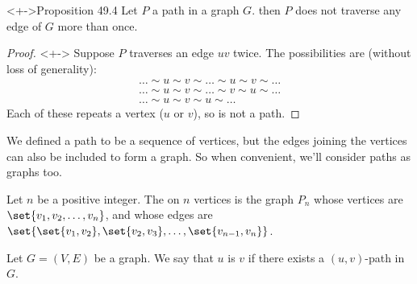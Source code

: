\documentclass
[ignorenonframetext,14pt,aspectratio=169]
{ngelessonslides}
\begin{document}
\begin{frame}[label=path-prop]
\begin{block}<+->{Proposition 49.4}
    Let $P$ a path in a graph $G$.  then $P$ does not traverse any edge of $G$ more than once.
\end{block}
\begin{proof}<+->
Suppose $P$ traverses an edge $uv$ twice.  The possibilities are (without loss of generality):
\begin{gather*}
 \dots \sim u \sim v \sim \dots \sim u \sim v \sim \dots \\
\dots \sim u \sim v \sim \dots \sim v \sim u \sim \dots \\
\dots \sim u \sim v \sim u \sim \dots
\end{gather*}
Each of these repeats a vertex ($u$ or $v$), so is not a path.
\end{proof}
\end{frame}

\begin{frame}[label=path-graph-def]
We defined a path to be a sequence of vertices, but the edges joining the vertices
can also be included to form a graph.  So when convenient, we'll consider paths as graphs too.
\begin{definition}
    Let $n$ be a positive integer.
    The  on $n$ vertices is the graph $P_n$ whose vertices
    are $\set{v_1,v_2,\dots,v_n}$, and whose edges are
    $\set{\set{v_1,v_2},\set{v_2,v_3},\dots,\set{v_{n-1},v_n}}$.
\end{definition}
\end{frame}

\begin{frame}[label=ctdto-def]
\begin{definition}[Connected to]
    Let $G=(V,E)$ be a graph.
    We say that $u$ is  $v$ if there exists a $(u,v)$-path in $G$.
\end{definition}
\end{frame}
\end{document}
